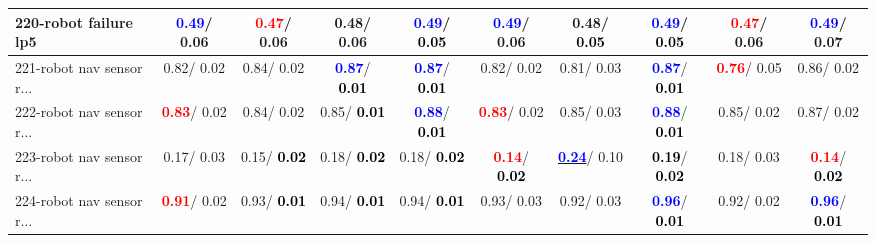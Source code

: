 \begin{table}[h]
\begin{center}
{\begin{tabular}{lc|c|c|c|c|c|c|c|c}
220-robot failure lp5 & \textcolor{blue}{\textbf{  0.49}}/  0.06 & \textcolor{red}{\textbf{  0.47}}/  0.06 &   0.48/  0.06 & \textcolor{blue}{\textbf{  0.49}}/\textcolor{black}{\textbf{  0.05}} & \textcolor{blue}{\textbf{  0.49}}/  0.06 &   0.48/\textcolor{black}{\textbf{  0.05}} & \textcolor{blue}{\textbf{  0.49}}/\textcolor{black}{\textbf{  0.05}} & \textcolor{red}{\textbf{  0.47}}/  0.06 & \textcolor{blue}{\textbf{  0.49}}/  0.07 \\ \hline
221-robot nav sensor r... &   0.82/  0.02 &   0.84/  0.02 & \textcolor{blue}{\textbf{  0.87}}/\textcolor{black}{\textbf{  0.01}} & \textcolor{blue}{\textbf{  0.87}}/\textcolor{black}{\textbf{  0.01}} &   0.82/  0.02 &   0.81/  0.03 & \textcolor{blue}{\textbf{  0.87}}/\textcolor{black}{\textbf{  0.01}} & \textcolor{red}{\textbf{  0.76}}/  0.05 &   0.86/  0.02 \\
222-robot nav sensor r... & \textcolor{red}{\textbf{  0.83}}/  0.02 &   0.84/  0.02 &   0.85/\textcolor{black}{\textbf{  0.01}} & \textcolor{blue}{\textbf{  0.88}}/\textcolor{black}{\textbf{  0.01}} & \textcolor{red}{\textbf{  0.83}}/  0.02 &   0.85/  0.03 & \textcolor{blue}{\textbf{  0.88}}/\textcolor{black}{\textbf{  0.01}} &   0.85/  0.02 &   0.87/  0.02 \\
223-robot nav sensor r... &   0.17/  0.03 &   0.15/\textcolor{black}{\textbf{  0.02}} &   0.18/\textcolor{black}{\textbf{  0.02}} &   0.18/\textcolor{black}{\textbf{  0.02}} & \textcolor{red}{\textbf{  0.14}}/\textcolor{black}{\textbf{  0.02}} & \underline{\textcolor{blue}{\textbf{  0.24}}}/  0.10 & \textcolor{black}{\textbf{  0.19}}/\textcolor{black}{\textbf{  0.02}} &   0.18/  0.03 & \textcolor{red}{\textbf{  0.14}}/\textcolor{black}{\textbf{  0.02}} \\
224-robot nav sensor r... & \textcolor{red}{\textbf{  0.91}}/  0.02 &   0.93/\textcolor{black}{\textbf{  0.01}} &   0.94/\textcolor{black}{\textbf{  0.01}} &   0.94/\textcolor{black}{\textbf{  0.01}} &   0.93/  0.03 &   0.92/  0.03 & \textcolor{blue}{\textbf{  0.96}}/\textcolor{black}{\textbf{  0.01}} &   0.92/  0.02 & \textcolor{blue}{\textbf{  0.96}}/\textcolor{black}{\textbf{  0.01}} \\\end{tabular}}\label{stratsALCKappa6AllReduxalla}
\end{center}
\end{table}
